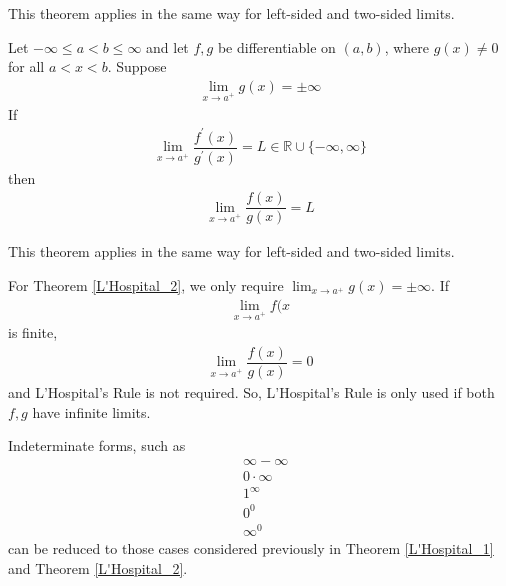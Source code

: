 \begin{note}
This theorem applies in the same way for left-sided and two-sided limits.
\end{note}

\begin{theorem}
Let $-\infty \leq a < b \leq \infty$ and let $f, g$ be differentiable on $(a, b)$, where $g(x) \neq 0$ for all $a < x < b$. Suppose
\begin{align*}
    \lim_{x \longrightarrow a^{+}} g(x) = \pm \infty 
\end{align*}
If
\begin{align*}
    \lim_{x \longrightarrow a^{+}} \dfrac{f^{'}(x)}{g^{'}(x)} = L \in \mathbb{R} \cup \{-\infty, \infty\}
\end{align*}
then
\begin{align*}
    \lim_{x \longrightarrow a^{+}} \dfrac{f(x)}{g(x)} = L
\end{align*}
\label{L'Hospital_2}
\end{theorem}

\begin{note}
This theorem applies in the same way for left-sided and two-sided limits.
\end{note}

\begin{note}
For Theorem \ref{L'Hospital_2}, we only require $\lim_{x \longrightarrow a^{+}} g(x) = \pm \infty$. If 
\begin{align*}
    \lim_{x \longrightarrow a^{+}} f(x
\end{align*} 
is finite,
\begin{align*}
    \lim_{x \longrightarrow a^{+}} \dfrac{f(x)}{g(x)} = 0
\end{align*}
and L'Hospital's Rule is not required. So, L'Hospital's Rule is only used if both $f, g$ have infinite limits.
\end{note}

\begin{note}
Indeterminate forms, such as
\begin{align*}
    &\infty - \infty\\
    &0 \cdot \infty\\
    &1^{\infty}\\
    &0^{0}\\
    &\infty^{0}
\end{align*}
can be reduced to those cases considered previously in Theorem \ref{L'Hospital_1} and Theorem \ref{L'Hospital_2}. 
\end{note}